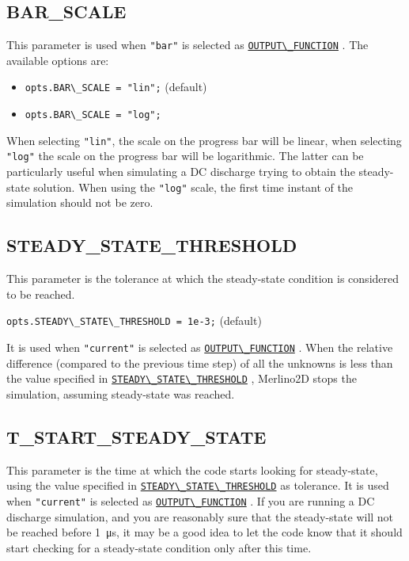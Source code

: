 \documentclass[12pt,a4paper]{article}
\newcommand{\matlabs}[1]{{\lstinline[style=MatlabStyle]!#1!}}
\newcommand{\seclink}[2]{%
	\begingroup
	\hypersetup{linkcolor=orange}%
	\hyperref[sec:#1]{\matlabs{#2}}%
	\endgroup
}
\begin{document}
	\subsection{BAR\_SCALE}
	\label{sec:barscale}
	This parameter is used when \matlabs{"bar"} is selected as \seclink{outputfunction}{OUTPUT\_FUNCTION}.
	The available options are:
	\begin{itemize}
		\item \matlabs{opts.BAR\_SCALE = "lin";} (default)
		\item \matlabs{opts.BAR\_SCALE = "log";}
	\end{itemize}
	When selecting \matlabs{"lin"}, the scale on the progress bar will be linear, when selecting \matlabs{"log"} the scale on the progress bar will be logarithmic. The latter can be particularly useful when simulating a DC discharge trying to obtain the steady-state solution. When using the \matlabs{"log"} scale, the first time instant of the simulation should not be zero.
	
	\subsection{STEADY\_STATE\_THRESHOLD}
	\label{sec:steadystatethreshold}
	This parameter is the tolerance at which the steady-state condition is considered to be reached. 
	
	\matlabs{opts.STEADY\_STATE\_THRESHOLD = 1e-3;} (default)
	
	\noindent It is used when \matlabs{"current"} is selected as \seclink{outputfunction}{OUTPUT\_FUNCTION}.
	When the relative difference (compared to the previous time step) of all the unknowns is less than the value specified in \seclink{steadystatethreshold}{STEADY\_STATE\_THRESHOLD}, Merlino2D stops the simulation, assuming steady-state was reached.
	
	\subsection{T\_START\_STEADY\_STATE}
	\label{sec:tstartsteadystate}
	This parameter is the time at which the code starts looking for steady-state, using the value specified in \seclink{steadystatethreshold}{STEADY\_STATE\_THRESHOLD} as tolerance. It is used when \matlabs{"current"} is selected as \seclink{outputfunction}{OUTPUT\_FUNCTION}. If you are running a DC discharge simulation, and you are reasonably sure that the steady-state will not be reached before \SI{1}{\micro\second}, it may be a good idea to let the code know that it should start checking for a steady-state condition only after this time.
	
\end{document}
